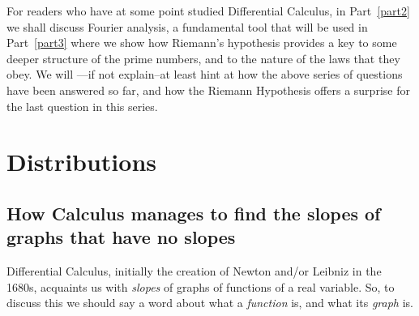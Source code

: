 \documentclass[openany]{book}
\theoremstyle{plain}
\theoremstyle{definition}
\newcommand{\RH}{Riemann Hypothesis\index{Riemann Hypothesis}}
\begin{document}
For readers who have at some point studied Differential Calculus, in
Part~\ref{part2} we shall discuss Fourier analysis, a fundamental tool that will be used in Part~\ref{part3}
where we show how
Riemann's hypothesis provides a key to some deeper structure of the
prime numbers, and to the nature of the laws that they obey. We will ---if not explain--at least
hint at how the above series of questions have been answered so far,
and how the \RH{} offers a surprise for the last question in this
series.









\part{Distributions\label{part2}}


\chapter[Slopes of graphs that have no slopes]{How Calculus manages to
  find the slopes of graphs that have no slopes}

Differential Calculus, initially the creation of Newton and/or Leibniz
in the 1680s, acquaints us with {\it slopes} of graphs of functions of
a real variable.  So, to discuss this we should say a word about what
a {\it function} is, and what its {\it graph} is.
\end{document}

